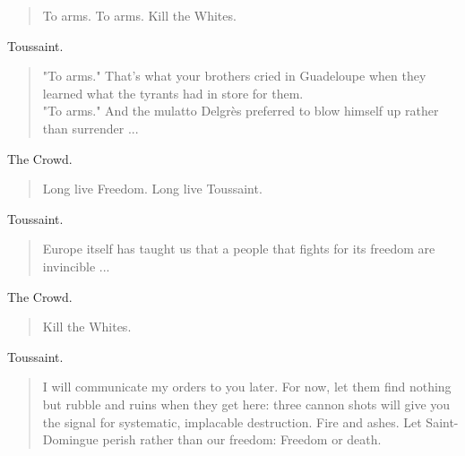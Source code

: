 \documentclass[letterpaper,article,12pt,oneside,notitlepage]{memoir}
\begin{document}
\begin{verse}
\hspace{1cm} To arms. To arms. Kill the Whites. \\
\end{verse}

\begin{center}Toussaint.\end{center}

\begin{verse}
\indent "To arms." That's what your brothers cried in Guadeloupe when they learned what the tyrants had in store for them.  \\
\indent "To arms." And the mulatto Delgrès preferred to blow himself up rather than surrender ...  \\
\end{verse}

\begin{center}The Crowd.\end{center}

\begin{verse}
\hspace{1cm} Long live Freedom. Long live Toussaint. \\
\end{verse}

\begin{center}Toussaint.\end{center}

\begin{verse}
\indent Europe itself has taught us that a people that fights for its freedom are invincible ... \\
\end{verse}

\begin{center}The Crowd.\end{center}

\begin{verse}
\hspace{1cm} Kill the Whites. \\
\end{verse}

\begin{center}Toussaint.\end{center}

\begin{verse}
\indent I will communicate my orders to you later. For now, let them find nothing but rubble and ruins when they get here: three cannon shots will give you the signal for systematic, implacable destruction. Fire and ashes. Let Saint-Domingue perish rather than our freedom: Freedom or death. \\
\end{verse}
\end{document}
